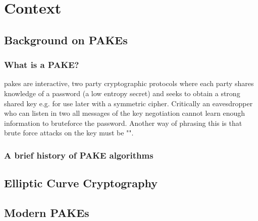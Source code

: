 \chapter{Context}

\section{Background on PAKEs}
\subsection{What is a PAKE?}
\glspl{pake} are interactive, two party cryptographic protocols where each party shares knowledge of a password (a low entropy secret) and seeks to obtain a strong shared key e.g. for use later with a symmetric cipher. Critically an eavesdropper who can listen in two all messages of the key negotiation cannot learn enough information to bruteforce the password. Another way of phrasing this is that brute force attacks on the key must be "".

\subsection{A brief history of PAKE algorithms}


\section{Elliptic Curve Cryptography}
\section{Modern PAKEs}
